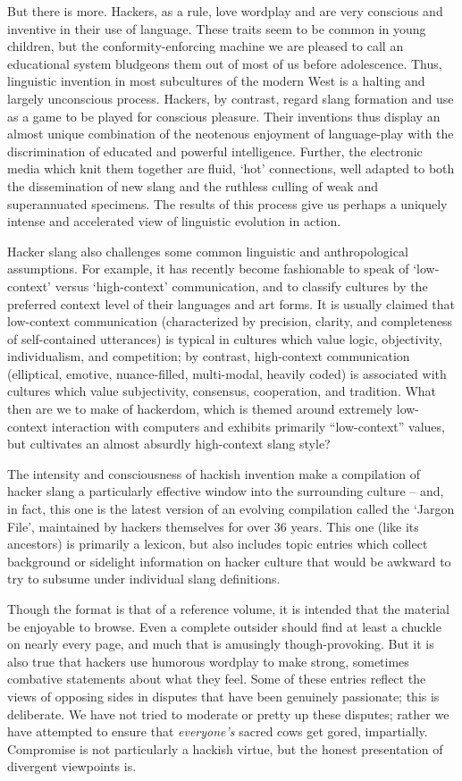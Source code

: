 But there is more. Hackers, as a rule, love wordplay and are very conscious and inventive in their use of language. These traits seem
to be common in young children, but the conformity-enforcing machine we are pleased to call an educational system bludgeons them out of
most of us before adolescence. Thus, linguistic invention in most subcultures of the modern West is a halting and largely unconscious
process. Hackers, by contrast, regard slang formation and use as a game to be played for conscious pleasure. Their inventions thus
display an almost unique combination of the neotenous enjoyment of language-play with the discrimination of educated and powerful
intelligence. Further, the electronic media which knit them together are fluid, `hot' connections, well adapted to both the
dissemination of new slang and the ruthless culling of weak and superannuated specimens. The results of this process give us perhaps a
uniquely intense and accelerated view of linguistic evolution in action.

Hacker slang also challenges some common linguistic and anthropological assumptions. For example, it has recently become fashionable to
speak of `low-context' versus `high-context' communication, and to classify cultures by the preferred context level of their languages
and art forms. It is usually claimed that low-context communication (characterized by precision, clarity, and completeness of
self-contained utterances) is typical in cultures which value logic, objectivity, individualism, and competition; by contrast,
high-context communication (elliptical, emotive, nuance-filled, multi-modal, heavily coded) is associated with cultures which value
subjectivity, consensus, cooperation, and tradition. What then are we to make of hackerdom, which is themed around extremely
low-context interaction with computers and exhibits primarily ``low-context'' values, but cultivates an almost absurdly high-context
slang style?

The intensity and consciousness of hackish invention make a compilation of hacker slang a particularly effective window into the
surrounding culture -- and, in fact, this one is the latest version of an evolving compilation called the `Jargon File', maintained by
hackers themselves for over 36 years. This one (like its ancestors) is primarily a lexicon, but also includes topic entries which
collect background or sidelight information on hacker culture that would be awkward to try to subsume under individual slang
definitions.

Though the format is that of a reference volume, it is intended that the material be enjoyable to browse. Even a complete outsider
should find at least a chuckle on nearly every page, and much that is amusingly though-provoking. But it is also true that hackers use
humorous wordplay to make strong, sometimes combative statements about what they feel. Some of these entries reflect the views of
opposing sides in disputes that have been genuinely passionate; this is deliberate. We have not tried to moderate or pretty up these
disputes; rather we have attempted to ensure that \textit{everyone's} sacred cows get gored, impartially. Compromise is not
particularly a hackish virtue, but the honest presentation of divergent viewpoints is.

